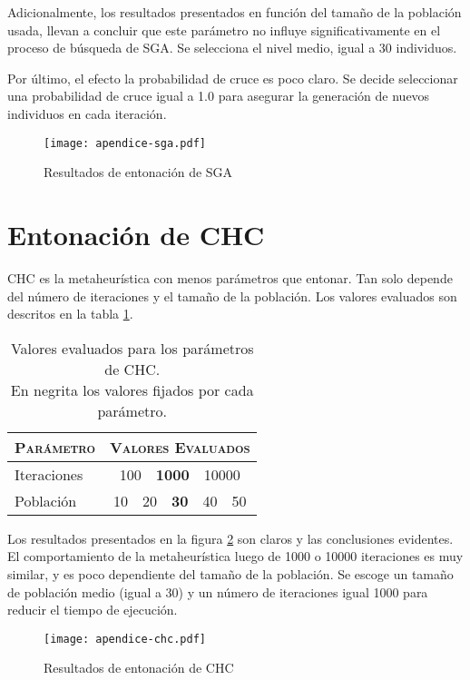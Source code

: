 Adicionalmente, los resultados presentados en función del tamaño de la población usada, llevan a concluir que este parámetro no influye significativamente en el proceso de búsqueda de SGA. Se selecciona el nivel medio, igual a 30 individuos.

Por último, el efecto la probabilidad de cruce es poco claro. Se decide seleccionar una probabilidad de cruce igual a 1.0 para asegurar la generación de nuevos individuos en cada iteración.

\begin{figure}[h!]
\centering
\texttt{[image: apendice-sga.pdf]}
\caption{Resultados de entonación de SGA}
\label{fig-ap-sga}
\end{figure}

\section{Entonación de CHC}

CHC es la metaheurística con menos parámetros que entonar. Tan solo depende del número de iteraciones y el tamaño de la población. Los valores evaluados son descritos en la tabla \ref{table-ap-chc}.

\begin{table}[h!]
\centering
\begin{tabular}{l c}
\hline
\textsc{Parámetro} & \textsc{Valores Evaluados} \\
\hline
\hline
Iteraciones & 100\ \ \textbf{1000}\ \ 10000 \\
Población   & 10\ \ 20\ \ \textbf{30}\ \ 40\ \ 50 \\
\hline
\end{tabular}
\caption[Valores evaluados para los parámetros de CHC]{Valores evaluados para los parámetros de CHC.\\En negrita los valores fijados por cada parámetro.}
\label{table-ap-chc}
\end{table}

Los resultados presentados en la figura \ref{fig-ap-chc} son claros y las conclusiones evidentes. El comportamiento de la metaheurística luego de 1000 o 10000 iteraciones es muy similar, y es poco dependiente del tamaño de la población. Se escoge un tamaño de población medio (igual a 30) y un número de iteraciones igual 1000 para reducir el tiempo de ejecución.

\begin{figure}[h!]
\centering
\texttt{[image: apendice-chc.pdf]}
\caption{Resultados de entonación de CHC}
\label{fig-ap-chc}
\end{figure}


